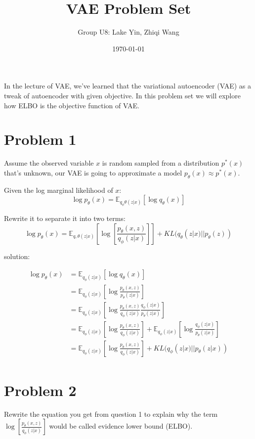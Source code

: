 \documentclass{article}
\begin{document}
\title{\vspace{-3cm}VAE Problem Set}
\author{Group U8: Lake Yin, Zhiqi Wang}
\date{\today}
\maketitle

In the lecture of VAE, we've learned that the variational autoencoder (VAE) as a tweak of autoencoder with given objective. In this problem set we will explore how ELBO is the objective function of VAE.

\section{Problem 1}
Assume the observed variable $x$ is random sampled from a distribution $p^*(x)$ that's unknown, our VAE is going to approximate a model $p_\theta(x) \approx p^*(x)$.

Given the log marginal likelihood of $x$: $$\log p_\theta (x) = \mathbb{E}_{q_\phi\theta(z|x)}[\log q_\theta (x)]$$

Rewrite it to separate it into two terms: $$\log p_\theta (x) = \mathbb{E}_{q,\theta(z|x)}\left[\log \left[\frac{p_\theta (x,z)}{q_\phi(z|x)}\right]\right] + KL(q_\theta(z|x)||p_\theta(z))$$

solution:

\color{blue}

\begin{align}
    \log p_\theta (x) &= \mathbb{E}_{q_\phi(z|x)}\left[\log q_\theta (x)\right]\\
    &= \mathbb{E}_{q_\phi(z|x)}\left[\log\frac{p_\theta(x,z)}{p_\theta(z|x)}\right]\\
    &= \mathbb{E}_{q_\phi(z|x)}\left[\log\frac{p_\theta(x,z)}{q_\phi(z|x)} \frac{q_\phi(z|x)}{p_\theta(z|x)}\right]\\
    &= \mathbb{E}_{q_\phi(z|x)}\left[\log\frac{p_\theta(x,z)}{q_\phi(z|x)}\right] + \mathbb{E}_{q_\phi(z|x)}\left[\log\frac{q_\phi(z|x)}{p_\theta(z|x)}\right]\\
    &= \mathbb{E}_{q_\phi(z|x)}\left[\log\frac{p_\theta(x,z)}{q_\phi(z|x)}\right] + KL(q_\phi(z|x)||p_\theta(z|x))\\
\end{align}

\color{black}

\bigskip

\section{Problem 2}
Rewrite the equation you get from question 1 to explain why the term $\log [\frac{p_\theta (x,z)}{q_\phi(z|x)}]$ would be called evidence lower bound (ELBO).
\end{document}
